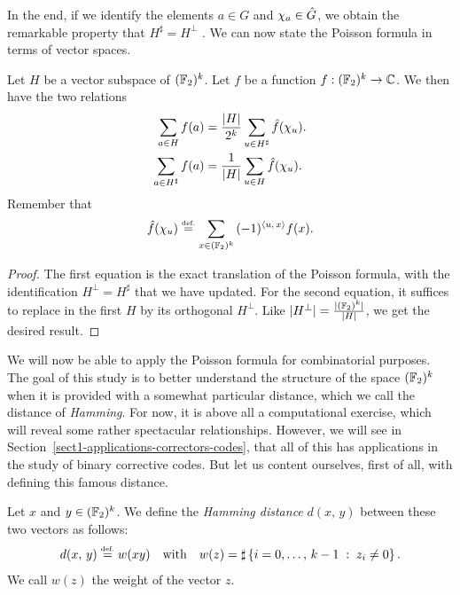  
In the end, if we identify the elements $ a \in G $ and $ \chi_a \in \hat{G} $, we obtain the remarkable property that $ H^{\sharp} = H^{\bot} $ . We can now state the Poisson formula in terms of vector spaces.
 
\begin{prop}
\label{prop-formula-vector-fish}
 Let $ H $ be a vector subspace of $ (\mathbb{F}_2)^k $. Let $ f $ be a function $ f: (\mathbb{F}_2)^k \rightarrow \mathbb{C} $. We then have the two relations
\begin{align}
\label{eq-formula-fish-vector-1}
\sum_{a \in H}{f(a)} & = \frac{| H |}{2^k} \sum_{u \in H^{\sharp}}{\hat{f} (\chi_u )}. \\
\label{eq-formula-vector-fish-2}
\sum_{a \in H^{\sharp}}{f(a)} & = \frac{1}{| H |} \sum_{u \in H}{\hat{f} (\chi_u)} .
\end{align}
Remember that
\begin{equation*}
\hat{f} (\chi_u) \stackrel{\mbox{\upshape\tiny def.}}{=} \sum_{x \in (\mathbb{F}_2)^k}{(-1)^{\langle u,\,x\rangle} f(x)}.
\end{equation*}
\end{prop}
\begin{proof}
The first equation is the exact translation of the Poisson formula, with the identification $ H^{\bot} = H^{\sharp} $ that we have updated. For the second equation, it suffices to replace in the first $ H $ by its orthogonal $ H^{\bot} $. Like $ | H^{\bot} | = \frac{| (\mathbb{F}_2)^k |}{| H |} $, we get the desired result.
\end{proof}
 
 
 
We will now be able to apply the Poisson formula for combinatorial purposes. The goal of this study is to better understand the structure of the space $ (\mathbb{F}_2)^k $ when it is provided with a somewhat particular distance, which we call the distance of \textit{Hamming}. For now, it is above all a computational exercise, which will reveal some rather spectacular relationships. However, we will see in Section~\ref{sect1-applications-correctors-codes}, that all of this has applications in the study of binary corrective codes. But let us content ourselves, first of all, with defining this famous distance.
 
\begin{defn}
 \label{notation-38} \label{notation-39} Let $ x $ and $ y \in (\mathbb{F}_2)^k $. We define the \textit{Hamming distance} $ d (x, \, y) $ between these two vectors as follows:
\begin{equation*}
d (x, \, y) \stackrel{\mbox{\upshape\tiny def.}}{=} w (xy) \quad \text{with} \quad w (z) = \sharp \left\{ i = 0, \ldots, \, k-1 \;:\; z_i \neq 0 \right\}.
\end{equation*}
We call $ w (z) $ the weight of the vector $ z $.
\end{defn}
 
